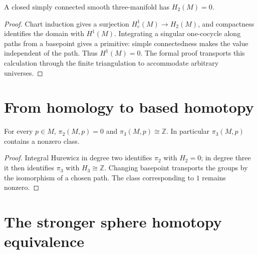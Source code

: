 \begin{proposition}
\label{prop:foundations-second-homology}
A closed simply connected smooth three-manifold has $H_2(M)=0$.
\end{proposition}
\begin{proof}
Chart induction gives a surjection $H_c^1(M)\to H_2(M)$, and
compactness identifies the domain with $H^1(M)$. Integrating a singular
one-cocycle along paths from a basepoint gives a primitive: simple
connectedness makes the value independent of the path. Thus $H^1(M)=0$.
The formal proof transports this calculation through the finite
triangulation to accommodate arbitrary universes.
\end{proof}

\section{From homology to based homotopy}
\label{sec:foundations-hurewicz}

\begin{corollary}
\label{cor:foundations-homotopy-groups}
For every $p\in M$, $\pi_2(M,p)=0$ and $\pi_3(M,p)\cong\mathbb Z$.
In particular $\pi_3(M,p)$ contains a nonzero class.
\end{corollary}
\begin{proof}
Integral Hurewicz in degree two identifies $\pi_2$ with $H_2=0$;
in degree three it then identifies $\pi_3$ with $H_3\cong\mathbb Z$.
Changing basepoint transports the groups by the isomorphism of a chosen
path. The class corresponding to $1$ remains nonzero.
\end{proof}

\section{The stronger sphere homotopy equivalence}
\label{sec:foundations-cw-equivalence}

